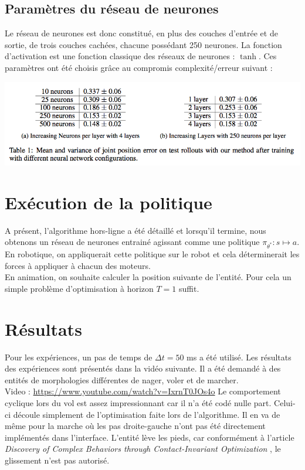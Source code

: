 \documentclass[a4paper,10pt]{article}
\begin{document}
\subsection{Paramètres du réseau de neurones}
Le réseau de neurones est donc constitué, en plus des couches d'entrée et de sortie, de trois couches cachées, chacune possédant 250 neurones. La fonction d'activation est une fonction classique des réseaux de neurones : $\tanh$. Ces paramètres ont été choisis grâce au compromis complexité/erreur suivant : \\
\begin{center}
\includegraphics[scale=0.4]{nn}
\end{center}

\section{Exécution de la politique}
A présent, l'algorithme hors-ligne a été détaillé et lorsqu'il termine, nous obtenons un réseau de neurones entrainé agissant comme une politique $\pi_{\theta^{*}} : s \mapsto a$.\\
En robotique, on appliquerait cette politique sur le robot et cela déterminerait les forces à appliquer à chacun des moteurs. \\
En animation, on souhaite calculer la position suivante de l'entité. Pour cela un simple problème d'optimisation à horizon $T=1$ suffit. 

\section{Résultats}
Pour les expériences, un pas de temps de $\Delta t = 50$ ms a été utilisé. Les résultats des expériences sont présentés dans la vidéo suivante. Il a été demandé à des entités de morphologies différentes de nager, voler et de marcher. \\
 Video : \url{https://www.youtube.com/watch?v=IxrnT0JOs4o}
 Le comportement cyclique lors du vol est assez impressionnant car il n'a été codé nulle part. Celui-ci découle simplement de l'optimisation faite lors de l'algorithme. Il en va de même pour la marche où les pas droite-gauche n'ont pas été directement implémentés dans l'interface. L'entité lève les pieds, car conformément à l'article \textit{Discovery of Complex Behaviors through Contact-Invariant Optimization} \cite{mordatch2012discovery}, le glissement n'est pas autorisé. 
\end{document}
